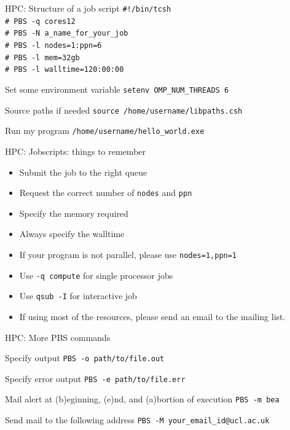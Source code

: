 \documentclass{beamer}
\begin{document}
\begin{frame}{HPC: Structure of a job script}
	\texttt{\#!/bin/tcsh \\
	\# PBS -q cores12 \\
	\# PBS -N a\_name\_for\_your\_job \\
	\# PBS -l nodes=1:ppn=6 \\
	\# PBS -l mem=32gb \\
	\# PBS -l walltime=120:00:00} \\
	
	\begin{block}{Set some environment variable}
	    \texttt{setenv OMP\_NUM\_THREADS 6}
        \end{block}
	\begin{block}{Source paths if needed}
	    \texttt{source /home/username/libpaths.csh}
        \end{block}
	\begin{block}{Run my program}
	    \texttt{/home/username/hello\_world.exe}
        \end{block}	
\end{frame}

\begin{frame}{HPC: Jobscripts: things to remember}
	\begin{itemize}
		\item Submit the job to the right queue
		\item Request the correct number of \texttt{nodes} and \texttt{ppn}
		\item Specify the memory required
		\item Always specify the walltime
		\item If your program is not parallel, please use \texttt{nodes=1,ppn=1}
		\item Use \texttt{-q compute} for single processor jobs
		\item Use \texttt{qsub -I} for interactive job
		\item If using most of the resources, please send an email to the mailing list.
	\end{itemize}
\end{frame}

\begin{frame}{HPC: More PBS commands}
	\begin{block}{Specify output}
	    \texttt{PBS -o path/to/file.out}
        \end{block}
	\begin{block}{Specify error output}
	    \texttt{PBS -e path/to/file.err}
        \end{block}
	\begin{block}{Mail alert at (b)eginning, (e)nd, and (a)bortion of execution}
	    \texttt{PBS -m bea}
        \end{block}
	\begin{block}{Send mail to the following address}
	    \texttt{PBS -M your\_email\_id@ucl.ac.uk}
        \end{block}                        
\end{frame}
\end{document}
